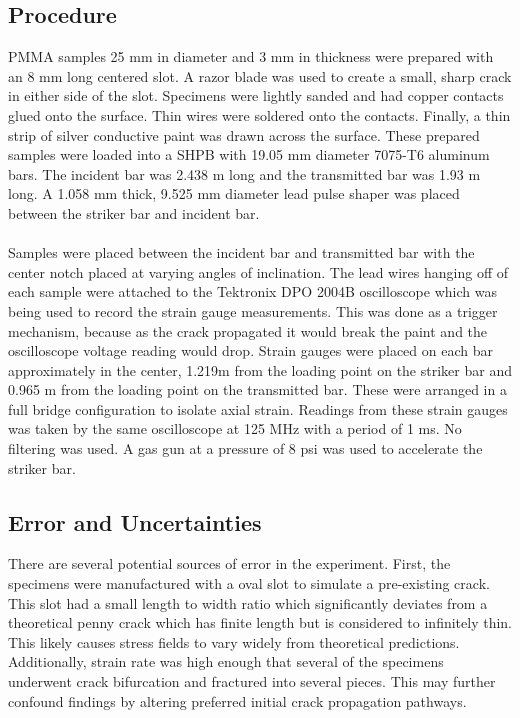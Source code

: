 \documentclass[12pt]{article}
\begin{document}
\subsection{Procedure} %
PMMA samples 25 mm in diameter and 3 mm in thickness were prepared with an 8 mm long centered slot. A razor blade was used to create a small, sharp crack in either side of the slot. Specimens were lightly sanded and had copper contacts glued onto the surface. Thin wires were soldered onto the contacts. Finally, a thin strip of silver conductive paint was drawn across the surface. These prepared samples were loaded into a SHPB with 19.05 mm diameter 7075-T6 aluminum bars. The incident bar was 2.438 m long and the transmitted bar was 1.93 m long. A 1.058 mm thick, 9.525 mm diameter lead pulse shaper was placed between the striker bar and incident bar.
\\ \\
Samples were placed between the incident bar and transmitted bar with the center notch placed at varying angles of inclination. The lead wires hanging off of each sample were attached to the Tektronix DPO 2004B oscilloscope which was being used to record the strain gauge measurements. This was done as a trigger mechanism, because as the crack propagated it would break the paint and the oscilloscope voltage reading would drop. Strain gauges were placed on each bar approximately in the center, 1.219m from the loading point on the striker bar and 0.965 m from the loading point on the transmitted bar. These were arranged in a full bridge configuration to isolate axial strain. Readings from these strain gauges was taken by the same oscilloscope at 125 MHz with a period of 1 ms. No filtering was used. A gas gun at a pressure of 8 psi was used to accelerate the striker bar.

\subsection{Error and Uncertainties} %
There are several potential sources of error in the experiment. First, the specimens were manufactured with a oval slot to simulate a pre-existing crack. This slot had a small length to width ratio which significantly deviates from a theoretical penny crack which has finite length but is considered to infinitely thin. This likely causes stress fields to vary widely from theoretical predictions. Additionally, strain rate was high enough that several of the specimens underwent crack bifurcation and fractured into several pieces. This may further confound findings by altering preferred initial crack propagation pathways. 
\end{document}
